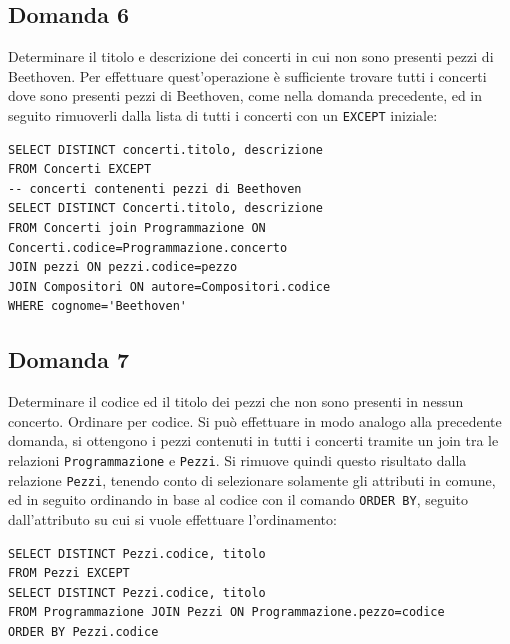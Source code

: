 \documentclass{article}
\numberwithin{equation}{subsection}
\begin{document}
\subsection{Domanda 6}
Determinare il titolo e descrizione dei concerti in cui non sono presenti pezzi di Beethoven. Per effettuare quest'operazione è sufficiente trovare tutti i concerti dove sono presenti 
pezzi di Beethoven, come nella domanda precedente, ed in seguito rimuoverli dalla lista di tutti i concerti con un \verb|EXCEPT| iniziale:
\begin{verbatim}
SELECT DISTINCT concerti.titolo, descrizione
FROM Concerti EXCEPT
-- concerti contenenti pezzi di Beethoven
SELECT DISTINCT Concerti.titolo, descrizione 
FROM Concerti join Programmazione ON Concerti.codice=Programmazione.concerto
JOIN pezzi ON pezzi.codice=pezzo
JOIN Compositori ON autore=Compositori.codice
WHERE cognome='Beethoven'
\end{verbatim}

\subsection{Domanda 7}
Determinare il codice ed il titolo dei pezzi che non sono presenti in nessun concerto. Ordinare per codice. Si può effettuare in modo analogo alla precedente domanda, si ottengono i pezzi contenuti in tutti i 
concerti tramite un join tra le relazioni \verb|Programmazione| e \verb|Pezzi|. Si rimuove quindi questo risultato dalla relazione \verb|Pezzi|, tenendo conto di selezionare solamente gli attributi in comune, ed 
in seguito ordinando in base al codice con il comando \verb|ORDER BY|, seguito dall'attributo su cui si vuole effettuare l'ordinamento: 
\begin{verbatim}
SELECT DISTINCT Pezzi.codice, titolo
FROM Pezzi EXCEPT
SELECT DISTINCT Pezzi.codice, titolo
FROM Programmazione JOIN Pezzi ON Programmazione.pezzo=codice
ORDER BY Pezzi.codice 
\end{verbatim}
\end{document}
